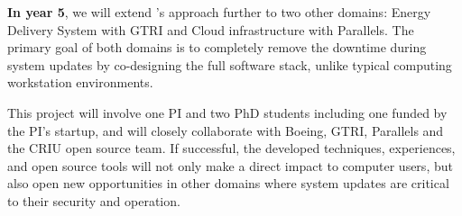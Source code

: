 \textbf{In year 5}, we will extend \sys's approach further to
two other domains:
Energy Delivery System with GTRI
and Cloud infrastructure with Parallels.
%
The primary goal of both domains is to completely
remove the downtime during system updates
by co-designing the full software stack,
unlike typical computing workstation environments.

This project will involve one PI and two PhD students
including one funded by the PI's startup,
and will closely collaborate with
Boeing, GTRI, Parallels and the CRIU open source team.
%
If successful, the developed techniques, experiences,
and open source tools
will not only make a direct impact to computer users,
but also open new opportunities in other domains
where system updates are critical to their security and operation.

%
